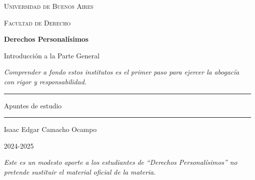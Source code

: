 \documentclass[12pt,oneside]{book}
\newcommand{\universidad}{Universidad de Buenos Aires}
\newcommand{\facultad}{Facultad de Derecho}
\newcommand{\materia}{Derechos Personalísimos}
\newcommand{\titulo}{Introducción a la Parte General}
\newcommand{\autor}{Isaac Edgar Camacho Ocampo}
\newcommand{\anio}{2024-2025}
\begin{document}
\begin{titlepage}

\thispagestyle{empty}

\begin{center}

\vspace*{1cm}

{\large \textsc{\universidad}}

\vspace{0.2cm}

{\large \textsc{\facultad}}

\vspace{3cm}

{\Huge \textbf{\materia}}

\vspace{1cm}

{\LARGE \titulo}

\vspace{0.8cm}

\textit{Comprender a fondo estos institutos es el primer paso para ejercer la abogacía con rigor y responsabilidad.}

\vspace{1.2cm}

\rule{0.70\textwidth}{0.5pt}

\vspace{0.5cm}

{\large Apuntes de estudio}

\vspace{0.5cm}

\rule{0.70\textwidth}{0.5pt}

\vfill

{\large \autor}

\vspace{0.3cm}

{\large \anio}

\end{center}

\vfill

\begin{flushleft}
\textit{Este es un modesto aporte a los estudiantes de ``\materia'' no pretende sustituir el material oficial de la materia.}
\end{flushleft}

\end{titlepage}

\tableofcontents
\end{document}
